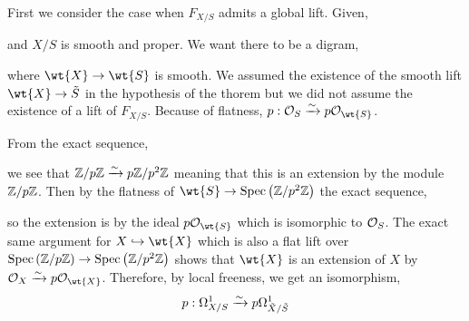 \documentclass[12pt]{article}
\begin{document}
First we consider the case when $F_{X/S}$ admits a global lift. Given,
\begin{center}
\end{center}
and $X/S$ is smooth and proper. We want there to be a digram,
\begin{center}
\end{center}
where $\wt{X} \to \wt{S}$ is smooth. We assumed the existence of the smooth lift $\wt{X} \to \tilde{S}$ in the hypothesis of the thorem but we did not assume the existence of a lift of $F_{X/S}$. Because of flatness, $p : \struct{S} \iso p \struct{\wt{S}}$. 

\begin{rmk}
From the exact sequence,
\begin{center}
\end{center}
we see that $\mathbb{Z}/p\mathbb{Z} \xrightarrow{\sim} p \mathbb{Z}/p^2\mathbb{Z}$ meaning that this is an extension  by the module $\mathbb{Z}/p\mathbb{Z}$. Then by the flatness of $\wt{S} \to \Spec{\Z/p^2\Z}$ the exact sequence,
\begin{center}
\end{center}
so the extension is by the ideal $p \struct{\wt{S}}$ which is isomorphic to $\mathcal{O}_{S}$. The exact same argument for $X \embed \wt{X}$ which is also a flat lift over $\mathrm{Spec}\left( \mathbb{Z}/p\mathbb{Z} \right) \to \mathrm{Spec}\left( \mathbb{Z}/p^2\mathbb{Z} \right)$ shows that $\wt{X}$ is an extension of $X$ by $\struct{X} \iso p \struct{\wt{X}}$. Therefore, by local freeness, we get an isomorphism,
\[ p : \Omega^1_{X/S} \xrightarrow{\sim} p \Omega^1_{\tilde{X}/\tilde{S}} \]
\end{rmk}
\end{document}
